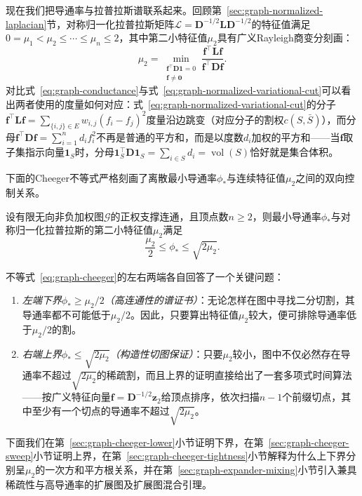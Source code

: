 现在我们把导通率与拉普拉斯谱联系起来。回顾第~\ref{sec:graph-normalized-laplacian}节，对称归一化拉普拉斯矩阵$\mathcal L=\bm D^{-1/2}\bm L\bm D^{-1/2}$的特征值满足$0=\mu_1<\mu_2\leq\cdots\leq\mu_n\leq 2$，其中第二小特征值$\mu_2$具有广义Rayleigh商变分刻画：
\begin{equation}
\label{eq:graph-normalized-variational-cut}
\mu_2=\min_{\substack{\bm f^\top\bm D\bm1=0\\\bm f\ne\bm0}}
       \frac{\bm f^\top\bm L\bm f}{\bm f^\top\bm D\bm f}.
\end{equation}
对比式~\eqref{eq:graph-conductance}与式~\eqref{eq:graph-normalized-variational-cut}可以看出两者使用的度量如何对应：式~\eqref{eq:graph-normalized-variational-cut}的分子$\bm f^\top\bm L\bm f=\sum_{\{i,j\}\in E}w_{i,j}(f_i-f_j)^2$度量沿边跳变（对应分子的割权$c(S,\bar S)$），而分母$\bm f^\top\bm D\bm f=\sum_{i=1}^n d_i f_i^2$不再是普通的平方和，而是以度数$d_i$加权的平方和——当$\bm f$取子集指示向量$\bm 1_S$时，分母$\bm 1_S^\top\bm D\bm 1_S=\sum_{i\in S}d_i=\operatorname{vol}(S)$恰好就是集合体积。

下面的Cheeger不等式严格刻画了离散最小导通率$\phi_*$与连续特征值$\mu_2$之间的双向控制关系。

\begin{theorem}
\label{thm:graph-cheeger}
设有限无向非负加权图$\mathcal G$的正权支撑连通，且顶点数$n\geq 2$，则最小导通率$\phi_*$与对称归一化拉普拉斯的第二小特征值$\mu_2$满足
\begin{equation}
\label{eq:graph-cheeger}
\frac{\mu_2}{2}\leq\phi_*\leq \sqrt{2\mu_2}.
\end{equation}
\end{theorem}

不等式~\eqref{eq:graph-cheeger}的左右两端各自回答了一个关键问题：
\begin{enumerate}
\item \emph{左端下界$\phi_*\geq\mu_2/2$（高连通性的谱证书）}：无论怎样在图中寻找二分切割，其导通率都不可能低于$\mu_2/2$。因此，只要算出特征值$\mu_2$较大，便可排除导通率低于$\mu_2/2$的割。
\item \emph{右端上界$\phi_*\leq\sqrt{2\mu_2}$（构造性切图保证）}：只要$\mu_2$较小，图中不仅必然存在导通率不超过$\sqrt{2\mu_2}$的稀疏割，而且上界的证明直接给出了一套多项式时间算法——按广义特征向量$\bm f=\bm D^{-1/2}\bm z_2$给顶点排序，依次扫描$n-1$个前缀切点，其中至少有一个切点的导通率不超过$\sqrt{2\mu_2}$。
\end{enumerate}

下面我们在第~\ref{sec:graph-cheeger-lower}小节证明下界，在第~\ref{sec:graph-cheeger-sweep}小节证明上界，在第~\ref{sec:graph-cheeger-tightness}小节解释为什么上下界分别呈$\mu_2$的一次方和平方根关系，并在第~\ref{sec:graph-expander-mixing}小节引入兼具稀疏性与高导通率的扩展图及扩展图混合引理。

